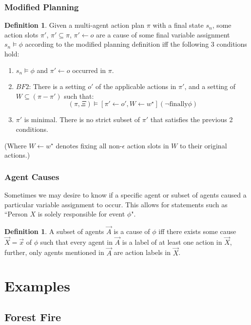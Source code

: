 \documentclass{article}
\theoremstyle{plain}
\theoremstyle{definition}
\newtheorem{defn}[thm]{Definition} %
\begin{document}
\subsubsection*{Modified Planning}
\begin{defn}
Given a multi-agent action plan $\pi$ with a final state $s_n$, some action slots $\pi'$, $\pi' \subseteq \pi$, $\pi' \leftarrow o$ are a cause of some final variable assignment $s_n \models \phi$ according to the modified planning definition iff the following 3 conditions hold:
\begin{enumerate}
\item $s_n \models \phi$ and $\pi'\leftarrow o$ occurred in $\pi$.
\item $BF2$: There is a setting $o'$ of the applicable actions in $\pi'$, and a setting of $W \subseteq (\pi  - \pi')$ such that:
\[
(\pi, \Xi) \models [\pi' \leftarrow o', W \leftarrow w^\star](\lnot \textrm{finally} \phi)
\]
\item $\pi'$ is minimal. There is no strict subset of $\pi'$ that satisfies the previous 2 conditions.
\end{enumerate}


(Where $W\leftarrow w^\star$ denotes fixing all non-$\epsilon$ action slots in $W$ to their original actions.)

\end{defn}

\subsubsection*{Agent Causes}
Sometimes we may desire to know if a specific agent or subset of agents caused a particular variable assignment to occur. This allows for statements such as ``Person $X$ is solely responsible for event $\phi$".
\begin{defn}
A subset of agents $\vec{A}$ is a cause of $\phi$ iff there exists some cause $\vec{X}=\vec{x}$ of $\phi$ such that every agent in $\vec{A}$ is a label of at least one action in $\vec{X}$, further, only agents mentioned in $\vec{A}$ are action labels in $\vec{X}$.
\end{defn}




\section{Examples} \label{sec:examples}
\subsection{Forest Fire} \label{sec:forestFire}
\end{document}
